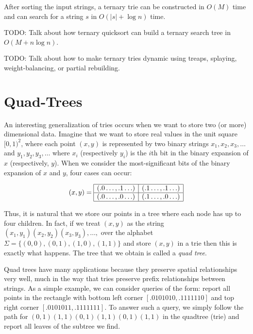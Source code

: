 \begin{thm}
After sorting the input strings, a ternary trie can be constructed in
$O(M)$ time and can search for a string $s$ in $O(|s|+\log n)$ time.
\end{thm}

TODO: Talk about how ternary quicksort can build a ternary search tree
in $O(M+n\log n)$.

TODO: Talk about how to make ternary tries dynamic using treaps, splaying, weight-balancing, or partial rebuilding.

\section{Quad-Trees}

An interesting generalization of tries occurs when we want to store
two (or more) dimensional data.  Imagine that we want to store real
values in the unit square $[0,1)^2$, where each point $(x,y)$ is
represented by two binary strings $x_1,x_2,x_3,\ldots$ and
$y_1,y_2,y_3,\ldots$ where $x_i$ (respectively $y_i$) is the
$i$th bit in the binary expansion of $x$ (respectively, $y$).  When we
consider the most-significant bits of the binary expansion of $x$ and
$y$, four cases can occur:


\[(x,y) = \begin{array}{|c|c|}\hline
(.0\ldots,.1\ldots) & (.1\ldots,.1\ldots) \\ \hline
(.0\ldots,.0\ldots) & (.1\ldots,.0\ldots) \\ \hline
\end{array}
\]

Thus, it is natural that we store our points in a tree where each node
has up to four children.  In fact, if we treat $(x,y)$ as the string
$(x_1,y_1)(x_2,y_2)(x_3,y_3),\ldots,$ over the alphabet
$\Sigma=\{(0,0),(0,1),(1,0),(1,1)\}$ and store $(x,y)$ in a trie then
this is exactly what happens.  The tree that we obtain is called a
\emph{quad tree}.

Quad trees have many applications because they preserve spatial
relationships very well, much in the way that tries preserve prefix
relationships between strings.  As a simple example, we can consider
queries of the form: report all points in the rectangle with bottom
left corner $[.0101010,.1111110]$ and top right corner
$[.0101011,.1111111]$.  To answer such a query, we simply follow the
path for $(0,1)(1,1)(0,1)(1,1)(0,1)(1,1)$ in the quadtree (trie) and
report all leaves of the subtree we find.

